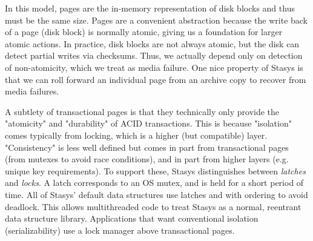 \documentclass[letterpaper,twocolumn,10pt]{article}
\newcommand{\yad}{Stasys\xspace}
\newcommand{\yads}{Stasys'\xspace}
\newcommand{\eat}[1]{}
\begin{document}
In this model, pages are the in-memory representation of disk blocks
and thus must be the same size.  Pages are a convenient abstraction
because the write back of a page (disk block) is normally atomic,
giving us a foundation for larger atomic actions. In practice, disk
blocks are not always atomic, but the disk can detect partial writes
via checksums.  Thus, we actually depend only on detection of
non-atomicity, which we treat as media failure.  One nice property of
\yad is that we can roll forward an individual page from an archive copy to
recover from media failures.

A subtlety of transactional pages is that they technically only
provide the "atomicity" and "durability" of ACID
transactions.  This is because "isolation" comes typically from locking, which
is a higher (but compatible) layer. "Consistency" is less well defined
but comes in part from transactional pages (from mutexes to avoid race
conditions), and in part from higher layers (e.g. unique key
requirements). To support these, \yad distinguishes between {\em
latches} and {\em locks}.  A latch corresponds to an OS mutex, and is
held for a short period of time.  All of \yads default data structures
use latches and with ordering to avoid deadlock. This allows
multithreaded code to treat \yad as a normal, reentrant data structure
library.  Applications that want conventional isolation
(serializability) use a lock manager above transactional pages.

\eat{
\yad uses write-ahead-logging to support the
four properties of transactional storage: Atomicity, Consistency,
Isolation and Durability.  Like existing transactional storage sytems,
\yad allows applications to disable or choose different variants of each
property.

However, \yad takes customization of transactional semantics one step
further, allowing applications to add support for transactional
semantics that we have not anticipated.  We do not believe that
we can anticipate every possible variation of write ahead logging.  
However, we
have observed that most changes that we are interested in making
involve a few common underlying primitives.  

As we have
implemented new extensions, we have located portions of the system
that are prone to change, and have extended the API accordingly.  Our
goal is to allow applications to implement their own modules to
replace our implementations of each of the major write ahead logging
components.
}
\end{document}
